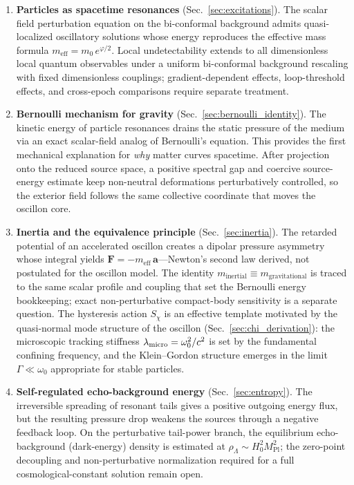 \documentclass[aps,prd,onecolumn,superscriptaddress,nofootinbib,showpacs,12pt,notitlepage]{revtex4-2}
\newcommand{\Mpl}{M_{\mathrm{Pl}}}
\newcommand{\meff}{m_{\mathrm{eff}}}
\begin{document}
\begin{enumerate}
  \item \textbf{Particles as spacetime resonances}
    (Sec.~\ref{sec:excitations}).  The scalar field
    perturbation equation on the bi-conformal background
    admits quasi-localized oscillatory solutions whose
    energy reproduces the effective mass formula
    $\meff = m_0\,e^{\varphi/2}$.  Local undetectability
    extends to all dimensionless local quantum observables
    under a uniform bi-conformal background rescaling with
    fixed dimensionless couplings; gradient-dependent effects,
    loop-threshold effects, and cross-epoch comparisons require
    separate treatment.

  \item \textbf{Bernoulli mechanism for gravity}
    (Sec.~\ref{sec:bernoulli_identity}).  The kinetic energy of
    particle resonances drains the static pressure of the
    medium via an exact scalar-field analog of Bernoulli's
    equation.  This provides the first mechanical explanation
    for \emph{why} matter curves spacetime.  After projection
    onto the reduced source space, a positive spectral gap and
    coercive source-energy estimate keep non-neutral
    deformations perturbatively controlled, so the exterior
    field follows the same collective coordinate that moves the
    oscillon core.

  \item \textbf{Inertia and the equivalence principle}
    (Sec.~\ref{sec:inertia}).  The retarded potential of
    an accelerated oscillon creates a dipolar pressure
    asymmetry whose integral yields
    $\mathbf{F} = -\meff\,\mathbf{a}$---Newton's second
    law derived, not postulated for the oscillon model.  The
    identity
    $m_{\mathrm{inertial}} \equiv m_{\mathrm{gravitational}}$
    is traced to the same scalar profile and coupling that set
    the Bernoulli energy bookkeeping; exact non-perturbative
    compact-body sensitivity is a separate question.  The
    hysteresis action $S_\chi$ is an effective template
    motivated by the quasi-normal mode structure of the
    oscillon (Sec.~\ref{sec:chi_derivation}): the microscopic
    tracking stiffness $\lambda_{\rm micro} = \omega_0^2/c^2$
    is set by the fundamental confining frequency, and the
    Klein--Gordon structure emerges in the limit
    $\Gamma \ll \omega_0$ appropriate for stable particles.

  \item \textbf{Self-regulated echo-background energy}
    (Sec.~\ref{sec:entropy}).  The irreversible spreading
    of resonant tails gives a positive outgoing energy flux,
    but the resulting
    pressure drop weakens the sources through a negative
    feedback loop.  On the perturbative tail-power branch,
    the equilibrium echo-background (dark-energy) density is
    estimated at
    $\rho_\Lambda \sim H_0^2 \Mpl^2$; the zero-point
    decoupling and non-perturbative normalization required for
    a full cosmological-constant solution remain open.


\end{enumerate}
\end{document}
